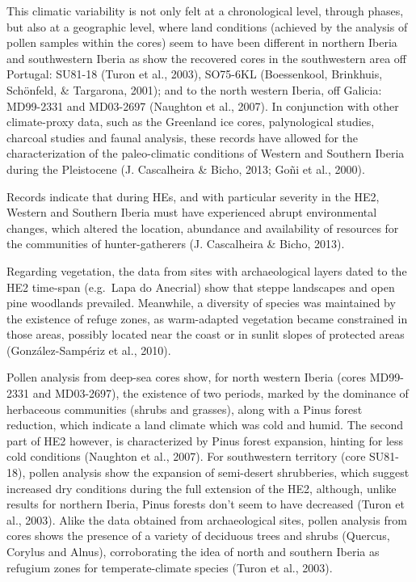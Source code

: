 \documentclass[12pt,twoside]{reedthesis}
\begin{document}
This climatic variability is not only felt at a chronological level, through phases, but also at a geographic level, where land conditions (achieved by the analysis of pollen samples within the cores) seem to have been different in northern Iberia and southwestern Iberia as show the recovered cores in the southwestern area off Portugal: SU81-18 (Turon et al., 2003), SO75-6KL (Boessenkool, Brinkhuis, Schönfeld, \& Targarona, 2001); and to the north western Iberia, off Galicia: MD99-2331 and MD03-2697 (Naughton et al., 2007). In conjunction with other climate-proxy data, such as the Greenland ice cores, palynological studies, charcoal studies and faunal analysis, these records have allowed for the characterization of the paleo-climatic conditions of Western and Southern Iberia during the Pleistocene (J. Cascalheira \& Bicho, 2013; Goñi et al., 2000).

Records indicate that during HEs, and with particular severity in the HE2, Western and Southern Iberia must have experienced abrupt environmental changes, which altered the location, abundance and availability of resources for the communities of hunter-gatherers (J. Cascalheira \& Bicho, 2013).

Regarding vegetation, the data from sites with archaeological layers dated to the HE2 time-span (e.g.~Lapa do Anecrial) show that steppe landscapes and open pine woodlands prevailed. Meanwhile, a diversity of species was maintained by the existence of refuge zones, as warm-adapted vegetation became constrained in those areas, possibly located near the coast or in sunlit slopes of protected areas (González-Sampériz et al., 2010).

Pollen analysis from deep-sea cores show, for north western Iberia (cores MD99-2331 and MD03-2697), the existence of two periods, marked by the dominance of herbaceous communities (shrubs and grasses), along with a Pinus forest reduction, which indicate a land climate which was cold and humid. The second part of HE2 however, is characterized by Pinus forest expansion, hinting for less cold conditions (Naughton et al., 2007). For southwestern territory (core SU81-18), pollen analysis show the expansion of semi-desert shrubberies, which suggest increased dry conditions during the full extension of the HE2, although, unlike results for northern Iberia, Pinus forests don't seem to have decreased (Turon et al., 2003). Alike the data obtained from archaeological sites, pollen analysis from cores shows the presence of a variety of deciduous trees and shrubs (Quercus, Corylus and Alnus), corroborating the idea of north and southern Iberia as refugium zones for temperate-climate species (Turon et al., 2003).
\end{document}
